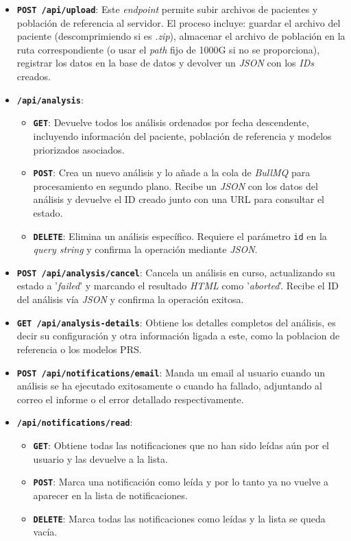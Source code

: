 \begin{itemize}
    \item \textbf{\texttt{POST /api/upload}}: Este \textit{endpoint} permite subir archivos de pacientes y población de referencia al servidor. El proceso incluye: guardar el archivo del paciente (descomprimiendo si es \textit{.zip}), almacenar el archivo de población en la ruta correspondiente (o usar el \textit{path} fijo de 1000G si no se proporciona), registrar los datos en la base de datos y devolver un \textit{JSON} con los \textit{IDs} creados.
    \item \textbf{\texttt{/api/analysis}}:
        \begin{itemize}
            \item \textbf{\texttt{GET}}: Devuelve todos los análisis ordenados por fecha descendente, incluyendo información del paciente, población de referencia y modelos priorizados asociados.
            \item \textbf{\texttt{POST}}: Crea un nuevo análisis y lo añade a la cola de \textit{BullMQ} para procesamiento en segundo plano. Recibe un \textit{JSON} con los datos del análisis y devuelve el ID creado junto con una URL para consultar el estado.
            \item \textbf{\texttt{DELETE}}: Elimina un análisis específico. Requiere el parámetro \texttt{id} en la \textit{query string} y confirma la operación mediante \textit{JSON}.
        \end{itemize}
        
    \item \textbf{\texttt{POST /api/analysis/cancel}}: Cancela un análisis en curso, actualizando su estado a '\textit{failed}' y marcando el resultado \textit{HTML} como '\textit{aborted}'. Recibe el ID del análisis vía \textit{JSON} y confirma la operación exitosa.
    
    \item \textbf{\texttt{GET /api/analysis-details}}: Obtiene los detalles completos del análisis, es decir su configuración y otra información ligada a este, como la poblacion de referencia o los modelos PRS.

    \item \textbf{\texttt{POST /api/notifications/email}}: Manda un email al usuario cuando un análisis se ha ejecutado exitosamente o cuando ha fallado, adjuntando al correo el informe o el error detallado respectivamente.
    
    \item \textbf{\texttt{/api/notifications/read}}:
        \begin{itemize}
            \item \textbf{\texttt{GET}}: Obtiene todas las notificaciones que no han sido leídas aún por el usuario y las devuelve a la lista.
            \item \textbf{\texttt{POST}}: Marca una notificación como leída y por lo tanto ya no vuelve a aparecer en la lista de notificaciones.
            \item \textbf{\texttt{DELETE}}: Marca todas las notificaciones como leídas y la lista se queda vacía.
        \end{itemize}
        

\end{itemize}
